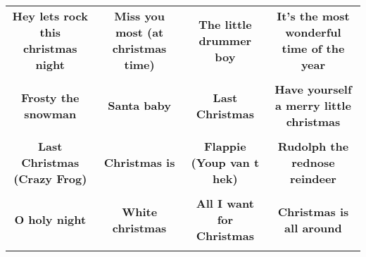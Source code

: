 \documentclass[12pt]{article} \usepackage{eso-pic, graphicx}
\newcommand{\background}[1]{%
\AddToShipoutPictureBG*{\texttt{[image: \#1]}}
}
\begin{document}
\tabcolsep=30.2pt \renewcommand{\arraystretch}{4.5}   \vspace*{4.3cm} \begin{center}  \begin{tabular}{c c c c}
\parbox{3cm}{\centering \textbf{Hey lets rock this christmas night}}& 
\parbox{3cm}{\centering \textbf{Miss you most (at christmas time)}}& 
\parbox{3cm}{\centering \textbf{The little drummer boy}}& 
\parbox{3cm}{\centering \textbf{It’s the most wonderful time of the year}}\\ \\ 
\parbox{3cm}{\centering \textbf{Frosty the snowman}}& 
\parbox{3cm}{\centering \textbf{Santa baby}}& 
\parbox{3cm}{\centering \textbf{Last Christmas}}& 
\parbox{3cm}{\centering \textbf{Have yourself a merry little christmas}}\\ \\ 
\parbox{3cm}{\centering \textbf{Last Christmas (Crazy Frog)}}& 
\parbox{3cm}{\centering \textbf{Christmas is}}& 
\parbox{3cm}{\centering \textbf{Flappie (Youp van t hek)}}& 
\parbox{3cm}{\centering \textbf{Rudolph the rednose reindeer}}\\ \\ 
\parbox{3cm}{\centering \textbf{O holy night}}& 
\parbox{3cm}{\centering \textbf{White christmas}}& 
\parbox{3cm}{\centering \textbf{All I want for Christmas}}& 
\parbox{3cm}{\centering \textbf{Christmas is all around}}\\ \\ 
\end{tabular} \background{discobingo.pdf} \end{center} 
\end{document}
